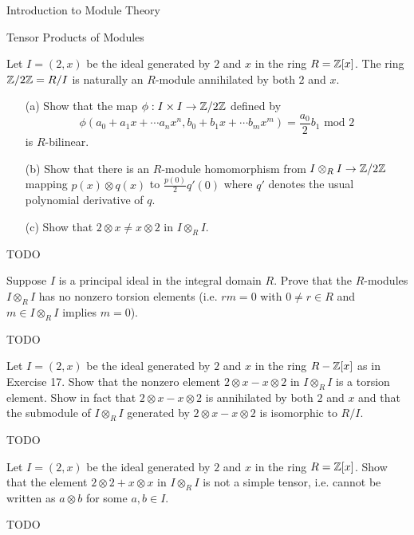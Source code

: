 \begin{chapter}{Introduction to Module Theory}
\begin{section}{Tensor Products of Modules}
\begin{problem}\label{ex:10.4.17}
Let $I=(2,x)$ be the ideal generated by $2$ and $x$ in the ring $R=\mathbb{Z}[x]$. The ring $\mathbb{Z}/2\mathbb{Z} = R/I$ is naturally an $R$-module annihilated by both $2$ and $x$. \begin{enumerate}
\item[(a)] Show that the map $\phi:I\times I\to \mathbb{Z}/2\mathbb{Z}$ defined by \[
\phi(a_0+a_1x+\cdots a_nx^n,b_0+b_1x+\cdots b_mx^m) = \frac{a_0}{2}b_1\text{ mod } 2 
\]
is $R$-bilinear.
\item[(b)] Show that there is an $R$-module homomorphism from $I\otimes_R I\to\mathbb{Z}/2\mathbb{Z}$ mapping $p(x)\otimes q(x)$ to $\frac{p(0)}{2}q'(0)$ where $q'$ denotes the usual polynomial derivative of $q$. 
\item[(c)] Show that $2\otimes x \neq x\otimes 2$ in $I \otimes_RI$. 
\end{enumerate}
\end{problem}
\begin{solution}TODO

\end{solution}\oneperpage



\begin{problem}\label{ex:10.4.18}
Suppose $I$ is a principal ideal in the integral domain $R$. Prove that the $R$-modules $I\otimes_R I$ has no nonzero torsion elements (i.e. $rm=0$ with $0\neq r \in R$ and $m\in I\otimes _RI$ implies $m=0$). 
\end{problem}
\begin{solution}TODO

\end{solution}\oneperpage



\begin{problem}\label{ex:10.4.19}
Let $I=(2,x)$ be the ideal generated by $2$ and $x$ in the ring $R-\mathbb{Z}[x]$ as in Exercise 17. Show that the nonzero element $2\otimes x-x\otimes 2$ in $I\otimes_R I$ is a torsion element. Show in fact that $2\otimes x - x\otimes 2$ is annihilated by both $2$ and $x$ and that the submodule of $I\otimes_R I$ generated by $2\otimes x - x\otimes 2$ is isomorphic to $R/I$. 
\end{problem}
\begin{solution}TODO

\end{solution}\oneperpage



\begin{problem}\label{ex:10.4.20}
Let $I=(2,x)$ be the ideal generated by $2$ and $x$ in the ring $R=\mathbb{Z}[x]$. Show that the element $2\otimes 2 + x\otimes x$ in $I\otimes_RI$ is not a simple tensor, i.e. cannot be written as $a\otimes b$ for some $a,b\in I$. 
\end{problem}
\begin{solution}TODO


\end{solution}
\end{section}
\end{chapter}
